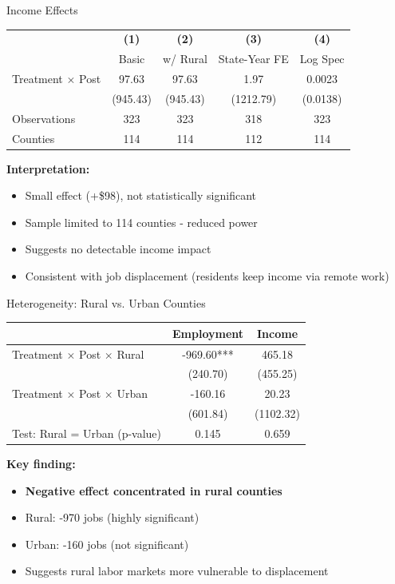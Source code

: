 \documentclass[aspectratio=169]{beamer}
\begin{document}
\begin{frame}{Income Effects}
\begin{table}
\footnotesize
\begin{tabular}{lcccc}
\toprule
 & \textbf{(1)} & \textbf{(2)} & \textbf{(3)} & \textbf{(4)} \\
 & Basic & w/ Rural & State-Year FE & Log Spec \\
\midrule
Treatment $\times$ Post & 97.63 & 97.63 & 1.97 & 0.0023 \\
 & (945.43) & (945.43) & (1212.79) & (0.0138) \\
\addlinespace
Observations & 323 & 323 & 318 & 323 \\
Counties & 114 & 114 & 112 & 114 \\
\bottomrule
\end{tabular}
\end{table}

\vspace{0.3cm}

\textbf{Interpretation:}
\begin{itemize}
    \item Small effect (+\$98), not statistically significant
    \item Sample limited to 114 counties - reduced power
    \item Suggests no detectable income impact
    \item Consistent with job displacement (residents keep income via remote work)
\end{itemize}
\end{frame}

\begin{frame}{Heterogeneity: Rural vs. Urban Counties}
\begin{table}
\footnotesize
\begin{tabular}{lcc}
\toprule
 & \textbf{Employment} & \textbf{Income} \\
\midrule
Treatment $\times$ Post $\times$ Rural & -969.60*** & 465.18 \\
 & (240.70) & (455.25) \\
\addlinespace
Treatment $\times$ Post $\times$ Urban & -160.16 & 20.23 \\
 & (601.84) & (1102.32) \\
\addlinespace
Test: Rural = Urban (p-value) & 0.145 & 0.659 \\
\bottomrule
\end{tabular}
\end{table}

\vspace{0.3cm}

\textbf{Key finding:}
\begin{itemize}
    \item \textbf{Negative effect concentrated in rural counties}
    \item Rural: -970 jobs (highly significant)
    \item Urban: -160 jobs (not significant)
    \item Suggests rural labor markets more vulnerable to displacement
\end{itemize}
\end{frame}
\end{document}
